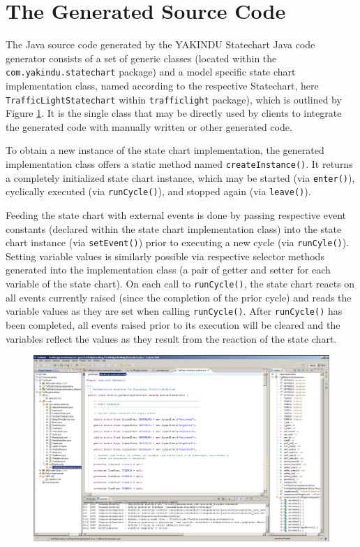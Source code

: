 %
\section{The Generated Source Code}

The Java source code generated by the YAKINDU Statechart Java code generator
consists of a set of generic classes (located within the
\texttt{com.yakindu.statechart} package) and a model specific state chart
implementation class, named according to the respective Statechart, here
\texttt{Traffic\-Light\-Statechart} within \texttt{trafficlight} package),
which is outlined by Figure \ref{fig:screenshot22}. It is the single class
that may be directly used by clients to integrate the generated code with
manually written or other generated code.

To obtain a new instance of the state chart implementation, the generated
implementation class offers a static method named \texttt{createInstance()}.
It returns a completely initialized state chart instance, which may be started
(via \texttt{enter()}), cyclically executed (via \texttt{runCycle()}), and
stopped again (via \texttt{leave()}).

Feeding the state chart with external events is done by passing respective
event constants (declared within the state chart implementation class) into
the state chart instance (via \texttt{setEvent()}) prior to executing a new
cycle (via \texttt{runCyle()}). Setting variable values is similarly possible
via respective selector methods generated into the implementation class (a
pair of getter and setter for each variable of the state chart). On each call
to \texttt{runCycle()}, the state chart reacts on all events currently raised
(since the completion of the prior cycle) and reads the variable values as
they are set when calling \texttt{runCycle()}. After \texttt{runCycle()} has
been completed, all events raised prior to its execution will be cleared and
the variables reflect the values as they result from the reaction of the state
chart.

\begin{figure}[h!]
\center
\includegraphics[width=\textwidth]{./Pictures/Screenshot22}
\caption{\label{fig:screenshot22}}
\end{figure}
\clearpage
